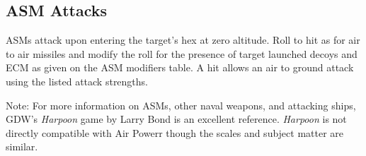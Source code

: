 \begin{advancedrules}
    \subsection{ASM Attacks} ASMs attack upon entering the target's hex at zero altitude. Roll to hit as for air to air missiles and modify the roll for the presence of target launched decoys and ECM as given on the ASM modifiers table. A hit allows an air to ground attack using the listed attack strengths.

    Note: For more information on ASMs, other naval weapons, and attacking ships, GDW's {\itshape Harpoon} game by Larry Bond is an excellent reference. {\itshape Harpoon} is not directly compatible with Air Powerr though the scales and subject matter are similar.

\end{advancedrules}

